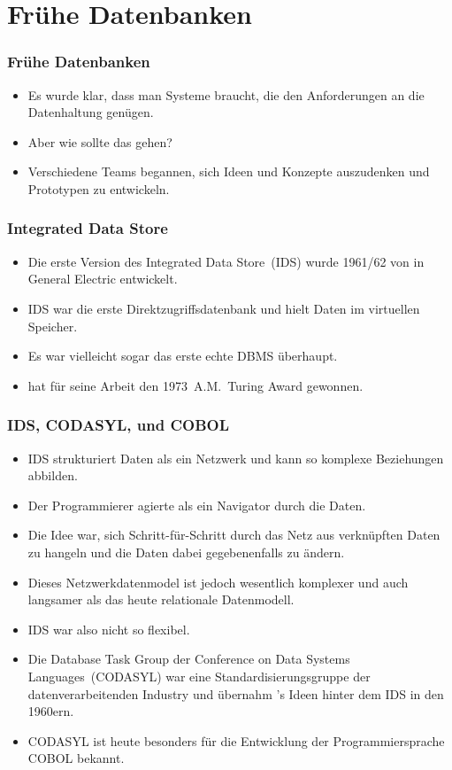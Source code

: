 \documentclass[aspectratio=169,mathserif,notheorems]{beamer}%
\begin{document}
\section{Frühe Datenbanken}%
%
\begin{frame}%
\frametitle{Frühe Datenbanken}%
\begin{itemize}%
\item Es wurde klar, dass man Systeme braucht, die den Anforderungen an die Datenhaltung genügen.%
\item<2-> Aber wie sollte das gehen?%
\item<3-> Verschiedene Teams begannen, sich Ideen und Konzepte auszudenken und Prototypen zu entwickeln.%
\end{itemize}%
\end{frame}%
%
\begin{frame}%
\frametitle{Integrated Data Store}%
\begin{itemize}%
\item Die erste Version des Integrated Data Store~(IDS) wurde 1961/62 von \citeauthor{B2009TOOTIDSITFDAD} in General Electric entwickelt\cite{B2009TOOTIDSITFDAD,B1965SFRAP}.%
\item<2-> IDS war die erste Direktzugriffsdatenbank und hielt Daten im virtuellen Speicher.%
\item<3-> Es war vielleicht sogar das erste echte DBMS überhaupt.%
\item<4->  hat für seine Arbeit den 1973~A.M.~Turing Award gewonnen\cite{H2016HCBITDAFOODW}.%
\end{itemize}%
\end{frame}%
%
\begin{frame}%
\frametitle{IDS, CODASYL, und COBOL}%
\begin{itemize}%
\item IDS strukturiert Daten als ein Netzwerk und kann so komplexe Beziehungen abbilden.%
\item<2-> Der Programmierer agierte als ein Navigator durch die Daten.%
\item<3-> Die Idee war, sich Schritt-für-Schritt durch das Netz aus verknüpften Daten zu hangeln und die Daten dabei gegebenenfalls zu ändern.%
\item<4-> Dieses Netzwerkdatenmodel ist jedoch wesentlich komplexer und auch langsamer als das heute relationale Datenmodell.%
\item<5-> IDS war also nicht so flexibel.%
\item<6-> Die Database Task Group der Conference on Data Systems Languages~(CODASYL)\cite{TF1976CDBMS} war eine Standardisierungsgruppe der datenverarbeitenden Industry und übernahm \citeauthor{B2009TOOTIDSITFDAD}'s Ideen hinter dem IDS in den 1960ern.%
\item<7-> CODASYL ist heute besonders für die Entwicklung der Programmiersprache COBOL bekannt\cite{H2016HCBITDAFOODW}.%
\end{itemize}%
\end{frame}%
\end{document}
